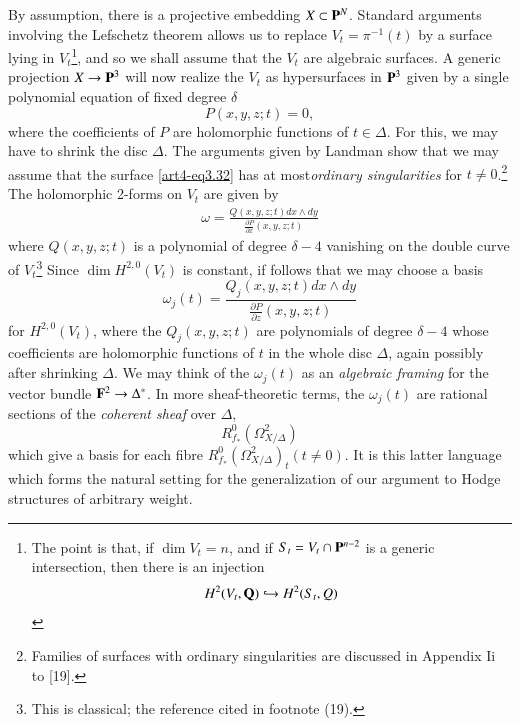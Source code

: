By assumption, there is a projective embedding $X \subset \mathbf{P}^N$. Standard arguments involving the Lefschetz theorem allows us to replace $V_t = \pi^{-1} (t)$ by a surface lying in $V_t$\footnote[18]{The point is that, if $\dim V_t=n$, and if $S_t = V_t \cap \mathbf{P}^{n-2}$ is a generic intersection, then there is an injection
$$
H^2 (V_t, \mathbf{Q}) \hookrightarrow H^2 (S_t, Q)
$$}, and so we shall assume that the $V_t$ are algebraic surfaces. A generic projection $X \to \mathbf{P}^3$ will now realize the $V_t$ as hypersurfaces in $\mathbf{P}^3$ given by a  single polynomial equation of fixed degree $\delta$
\begin{equation}
P(x, y, z; t) = 0, 
\label{art4-eq3.32}
\end{equation}
where the coefficients of $P$ are holomorphic functions of $t \in \Delta$. For this, we may have to shrink the disc $\Delta$. The arguments given by Landman \cite{art4-key35} show that we may assume that the surface \eqref{art4-eq3.32} has at most\pageoriginale \textit{ordinary singularities} for $t \neq 0$.\footnote[19]{Families of surfaces with ordinary singularities are discussed in Appendix Ii to [19].} The holomorphic 2-forms on $V_t$ are given by 
\begin{align*}
\omega = \frac{Q (x, y, z; t) dx \wedge dy}{\frac{\partial P}{\partial x} (x, y, z ; t)}
\end{align*}
where $Q (x, y, z ; t)$ is a polynomial of degree $\delta - 4$ vanishing on the double curve of $V_t$\footnote[20]{This is classical; \cf the reference cited in footnote (19).} Since $\dim H^{2,0} (V_t)$ is constant, if follows that we may choose a basis
\begin{equation}
\omega_j (t) = \frac{Q_j (x, y, z; t ) dx \wedge dy}{\frac{\partial P}{\partial z} (x, y, z ; t)}
\label{art4-eq3.33}
\end{equation}
for $H^{2,0} (V_t)$, where the $Q_j (x, y, z; t)$ are polynomials of degree $\delta - 4$ whose coefficients are holomorphic functions of $t$ in the whole disc $\Delta$, again possibly after shrinking $\Delta$. We may think of the $\omega_j(t)$ as an \textit{algebraic framing} for the vector bundle $\mathbf{F}^2 \to \Delta^\ast$. In more sheaf-theoretic terms, the $\omega_j (t)$ are rational sections of the \textit{coherent sheaf} over $\Delta$,
$$
R^0_{f_\ast} (\Omega^2_{X/\Delta})
$$
which give a basis for each fibre $R^0_{f_\ast} (\Omega^2_{X/\Delta})_t (t \neq 0)$. It is this latter language which forms the natural setting for the generalization of our argument to Hodge structures of arbitrary weight.

